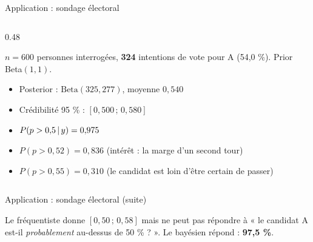 \begin{frame}{Application : sondage électoral}
\begin{columns}[t]
\begin{column}{0.48\textwidth}
\begin{ebox}[Données]
$n = 600$ personnes interrogées, \textbf{324} intentions de vote pour A (54,0 \%).
Prior Beta$(1,1)$.
\end{ebox}
\begin{solbox}
\begin{itemize}
  \item Posterior : $\mathrm{Beta}(325, 277)$, moyenne $0{,}540$
  \item Crédibilité 95 \% : $[0{,}500 \,;\, 0{,}580]$
  \item \textbf{$P(p > 0{,}5 \,\vert\, y) = 0{,}975$}
  \item $P(p > 0{,}52) = 0{,}836$ \quad (intérêt : la marge d'un second tour)
  \item $P(p > 0{,}55) = 0{,}310$ \quad (le candidat est loin d'être certain de passer)
\end{itemize}
\end{solbox}
\end{column}
\end{columns}
\end{frame}

\begin{frame}{Application : sondage électoral (suite)}
\begin{kbox}
Le fréquentiste donne $[0{,}50 \,;\, 0{,}58]$ mais ne peut pas répondre à
« le candidat A est-il \emph{probablement} au-dessus de 50 \% ? ».
Le bayésien répond : \textbf{97,5 \%}.
\end{kbox}
\end{frame}

